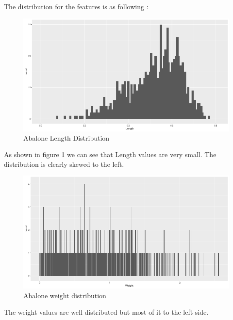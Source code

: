 \documentclass{article}
\begin{document}
\begin{multicols*}{2}
\begin{flushleft}
\begin{enumerate}
\end{enumerate}
\end{flushleft}

The distribution for the features is as following : 
\begin{figure}[H]
	\label{fig:ggplotLength}
	\begin{center}
	\includegraphics[scale=0.3]{ggplotLength.png}
	\end{center}
	\caption{Abalone Length Distribution }
\end{figure}
As shown in figure 1 we can see that Length values are very small. The distribution is clearly skewed to the left.\cite{2}
\begin{figure}[H]
	\begin{center}
		\includegraphics[scale=0.3]{ggplotweight.png}
	\end{center}
	\caption{Abalone weight distribution}
\end{figure}
The weight values are well distributed but most of it to the left side.
\begin{figure}[H]
\begin{center}

\end{center}
\end{figure}
\end{multicols*}
\end{document}
